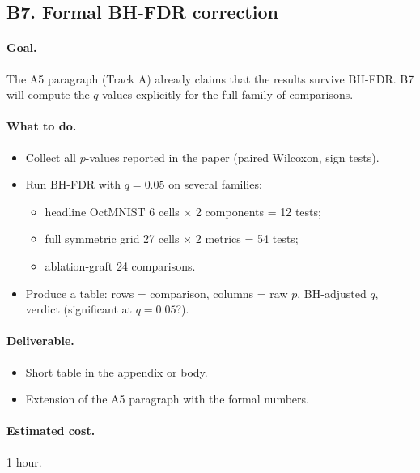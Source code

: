 \documentclass[11pt,a4paper]{article}
\begin{document}
\subsection{B7. Formal BH-FDR correction}

\paragraph{Goal.} The A5 paragraph (Track A) already claims that the
results survive BH-FDR. B7 will compute the $q$-values explicitly for the
full family of comparisons.

\paragraph{What to do.}
\begin{itemize}[nosep]
  \item Collect all $p$-values reported in the paper (paired Wilcoxon,
        sign tests).
  \item Run BH-FDR with $q=0.05$ on several families:
    \begin{itemize}[nosep]
      \item[(a)] headline OctMNIST 6 cells $\times$ 2 components = 12
                 tests;
      \item[(b)] full symmetric grid 27 cells $\times$ 2 metrics = 54
                 tests;
      \item[(c)] ablation-graft 24 comparisons.
    \end{itemize}
  \item Produce a table: rows = comparison, columns = raw $p$,
        BH-adjusted $q$, verdict (significant at $q=0.05$?).
\end{itemize}

\paragraph{Deliverable.}
\begin{itemize}[nosep]
  \item Short table in the appendix or body.
  \item Extension of the A5 paragraph with the formal numbers.
\end{itemize}

\paragraph{Estimated cost.} 1 hour.
\end{document}
